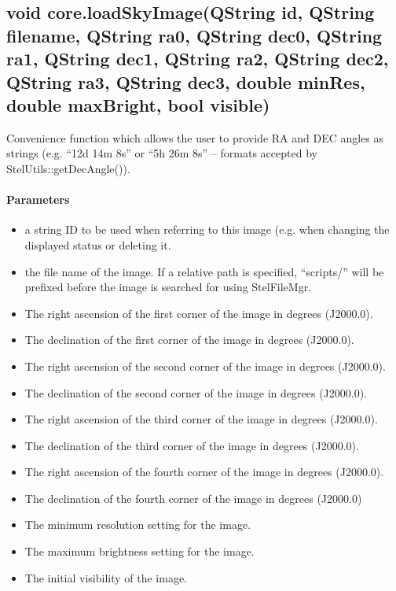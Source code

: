 \subsection{void core.loadSkyImage(QString id, QString filename, QString ra0, QString dec0, QString ra1, QString dec1, QString ra2, QString dec2, QString ra3, QString dec3, double minRes, double maxBright, bool visible)}
\label{sec:ScriptingAPI:core:loadSkyImageStr}
Convenience function which allows the user to provide RA and DEC angles as strings (e.g. ``12d 14m 8s'' or ``5h 26m 8s'' -- formats accepted by StelUtils::getDecAngle()).

\paragraph{Parameters}
\begin{itemize}
\item {} a string ID to be used when referring to this image (e.g. when changing the displayed status or deleting it.
\item {} the file name of the image. If a relative path is specified, ``scripts/'' will be prefixed before the image is searched for using StelFileMgr.
\item {} The right ascension of the first corner of the image in degrees (J2000.0).
\item {} The declination of the first corner of the image in degrees (J2000.0).
\item {} The right ascension of the second corner of the image in degrees (J2000.0).
\item {} 	The declination of the second corner of the image in degrees (J2000.0).
\item {} The right ascension of the third corner of the image in degrees (J2000.0).
\item {} The declination of the third corner of the image in degrees (J2000.0).
\item {} The right ascension of the fourth corner of the image in degrees (J2000.0).
\item {} The declination of the fourth corner of the image in degrees (J2000.0)
\item {} The minimum resolution setting for the image.
\item {} The maximum brightness setting for the image.
\item {} The initial visibility of the image.
\end{itemize}

